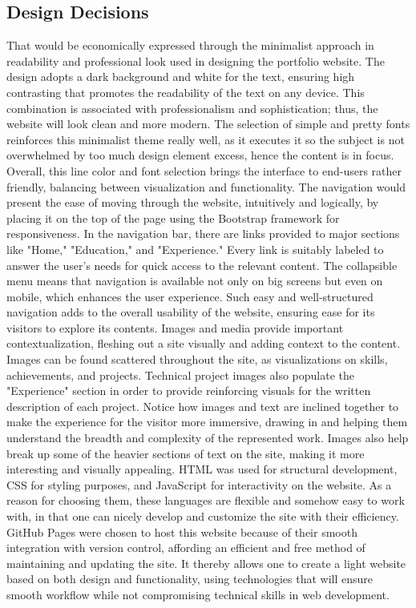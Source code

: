 \documentclass[a4paper,12pt]{article}
\begin{document}
\subsection{Design Decisions}
That would be economically expressed through the minimalist approach in readability and professional look used in designing the portfolio website. The design adopts a dark background and white for the text, ensuring high contrasting that promotes the readability of the text on any device. This combination is associated with professionalism and sophistication; thus, the website will look clean and more modern. The selection of simple and pretty fonts reinforces this minimalist theme really well, as it executes it so the subject is not overwhelmed by too much design element excess, hence the content is in focus. Overall, this line color and font selection brings the interface to end-users rather friendly, balancing between visualization and functionality.
The navigation would present the ease of moving through the website, intuitively and logically, by placing it on the top of the page using the Bootstrap framework for responsiveness. In the navigation bar, there are links provided to major sections like "Home," "Education," and "Experience." Every link is suitably labeled to answer the user's needs for quick access to the relevant content. The collapsible menu means that navigation is available not only on big screens but even on mobile, which enhances the user experience. Such easy and well-structured navigation adds to the overall usability of the website, ensuring ease for its visitors to explore its contents.
Images and media provide important contextualization, fleshing out a site visually and adding context to the content. Images can be found scattered throughout the site, as visualizations on skills, achievements, and projects. Technical project images also populate the "Experience" section in order to provide reinforcing visuals for the written description of each project. Notice how images and text are inclined together to make the experience for the visitor more immersive, drawing in and helping them understand the breadth and complexity of the represented work. Images also help break up some of the heavier sections of text on the site, making it more interesting and visually appealing.
HTML was used for structural development, CSS for styling purposes, and JavaScript for interactivity on the website. As a reason for choosing them, these languages are flexible and somehow easy to work with, in that one can nicely develop and customize the site with their efficiency. GitHub Pages were chosen to host this website because of their smooth integration with version control, affording an efficient and free method of maintaining and updating the site. It thereby allows one to create a light website based on both design and functionality, using technologies that will ensure smooth workflow while not compromising technical skills in web development.
\end{document}

